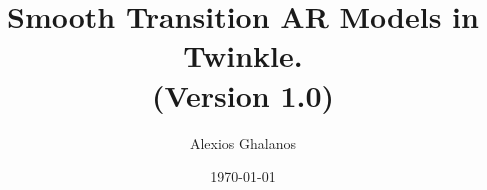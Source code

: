 \documentclass[11pt,a4paper]{article}
\begin{document}
\title{Smooth Transition AR Models in Twinkle.\\
(Version 1.0)}
\author{Alexios Ghalanos}
\date{\today}
\maketitle
\tableofcontents
\newpage

\clearpage

\end{document}
